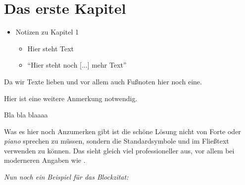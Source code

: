 
\section{Das erste Kapitel}

\begin{spacing}{1}
\begin{itemize}
	\item {} Notizen zu Kapitel 1
\begin{itemize}
	
\item Hier steht Text\autocite[Vgl.][55\psqq]{Buch1}
\item \enquote{Hier steht noch [...] mehr Text}\autocites(Auslassung: \verfasser)[2]{Buch1}

\end{itemize}
\end{itemize}
\end{spacing}

Da wir Texte lieben und vor allem auch Fußnoten\autocite[1-X]{biblatex1} hier noch eine. 


Hier ist eine weitere Anmerkung notwendig.

\blindtext

Bla bla blaaaa
\newline

Was es hier noch Anzumerken gibt ist die schöne Lösung nicht von Forte oder \textit{piano} sprechen zu müssen, sondern die Standardsymbole  und  im Fließtext verwenden zu können.
Das sieht gleich viel professioneller aus, vor allem bei moderneren Angaben wie .\perfekt

\blindtext

\begin{center}
\end{center}

\blindtext

\textsl{Nun noch ein Beispiel für das Blockzitat:}

\begin{Blockzitat}
	\blindtext\autocite{Buch2}
\end{Blockzitat}
